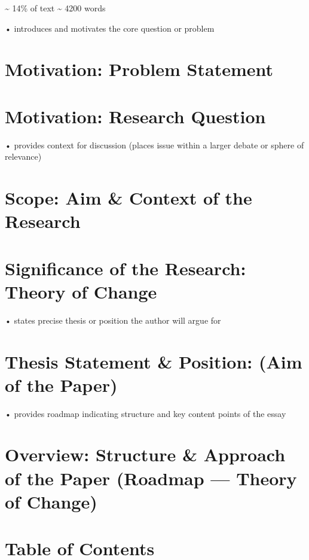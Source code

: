 \documentclass[12pt,a4paper]{book}      %
\begin{document}
\textasciitilde{} 14\% of text \textasciitilde{} 4200 words

• introduces and motivates the core question or problem

\section{Motivation: Problem
Statement}\label{motivation-problem-statement}

\section{Motivation: Research
Question}\label{motivation-research-question}

• provides context for discussion (places issue within a larger debate
or sphere of relevance)

\section{Scope: Aim \& Context of the
Research}\label{scope-aim-context-of-the-research}

\section{Significance of the Research: Theory of
Change}\label{significance-of-the-research-theory-of-change}

• states precise thesis or position the author will argue for

\section{Thesis Statement \& Position: (Aim of the
Paper)}\label{thesis-statement-position-aim-of-the-paper}

• provides roadmap indicating structure and key content points of the
essay

\section{Overview: Structure \& Approach of the Paper (Roadmap ---
Theory of
Change)}\label{overview-structure-approach-of-the-paper-roadmap-theory-of-change}

\section{Table of Contents}\label{table-of-contents}
\end{document}
